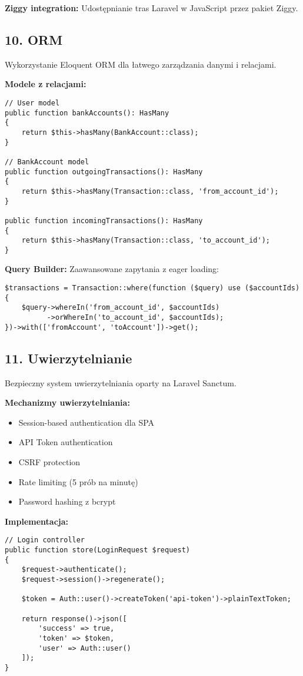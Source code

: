 \textbf{Ziggy integration:} Udostępnianie tras Laravel w JavaScript przez pakiet Ziggy.

\subsection{10. ORM}

Wykorzystanie Eloquent ORM dla łatwego zarządzania danymi i relacjami.

\textbf{Modele z relacjami:}
\begin{verbatim}
// User model
public function bankAccounts(): HasMany
{
    return $this->hasMany(BankAccount::class);
}

// BankAccount model
public function outgoingTransactions(): HasMany
{
    return $this->hasMany(Transaction::class, 'from_account_id');
}

public function incomingTransactions(): HasMany
{
    return $this->hasMany(Transaction::class, 'to_account_id');
}
\end{verbatim}

\textbf{Query Builder:} Zaawansowane zapytania z eager loading:
\begin{verbatim}
$transactions = Transaction::where(function ($query) use ($accountIds) {
    $query->whereIn('from_account_id', $accountIds)
          ->orWhereIn('to_account_id', $accountIds);
})->with(['fromAccount', 'toAccount'])->get();
\end{verbatim}

\subsection{11. Uwierzytelnianie}

Bezpieczny system uwierzytelniania oparty na Laravel Sanctum.

\textbf{Mechanizmy uwierzytelniania:}
\begin{itemize}
    \item Session-based authentication dla SPA
    \item API Token authentication
    \item CSRF protection
    \item Rate limiting (5 prób na minutę)
    \item Password hashing z bcrypt
\end{itemize}

\textbf{Implementacja:}
\begin{verbatim}
// Login controller
public function store(LoginRequest $request)
{
    $request->authenticate();
    $request->session()->regenerate();

    $token = Auth::user()->createToken('api-token')->plainTextToken;

    return response()->json([
        'success' => true,
        'token' => $token,
        'user' => Auth::user()
    ]);
}
\end{verbatim}

